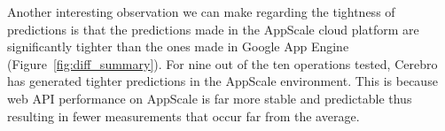 %

Another interesting observation we can make regarding the tightness of
predictions is that the predictions made in the AppScale cloud platform are
significantly tighter than the ones made in Google App Engine
(Figure~\ref{fig:diff_summary}). 
For nine out of the ten operations tested, Cerebro has generated tighter
predictions in the AppScale environment. This is because web API performance
on AppScale is far more stable and predictable thus resulting in fewer
measurements that occur far from the average.

